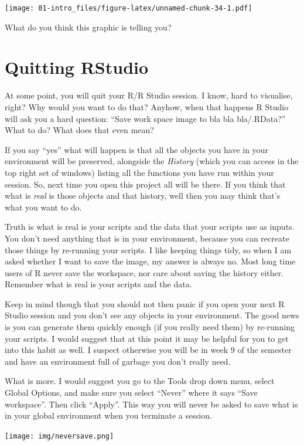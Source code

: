 \documentclass[]{book}
\begin{document}
\texttt{[image: 01-intro\_files/figure-latex/unnamed-chunk-34-1.pdf]}

What do you think this graphic is telling you?

\hypertarget{quitting-rstudio}{%
\section{Quitting RStudio}\label{quitting-rstudio}}

At some point, you will quit your R/R Studio session. I know, hard to visualise, right? Why would you want to do that? Anyhow, when that happens R Studio will ask you a hard question: ``Save work space image to bla bla bla/.RData?'' What to do? What does that even mean?

If you say ``yes'' what will happen is that all the objects you have in your environment will be preserved, alongside the \emph{History} (which you can access in the top right set of windows) listing all the functions you have run within your session. So, next time you open this project all will be there. If you think that what is \emph{real} is those objects and that history, well then you may think that's what you want to do.

Truth is what is real is your scripts and the data that your scripts use as inputs. You don't need anything that is in your environment, because you can recreate those things by re-running your scripts. I like keeping things tidy, so when I am asked whether I want to save the image, my answer is always no. Most long time users of R never save the workspace, nor care about saving the history either. Remember what is real is your scripts and the data.

Keep in mind though that you should not then panic if you open your next R Studio session and you don't see any objects in your environment. The good news is you can generate them quickly enough (if you really need them) by re-running your scripts. I would suggest that at this point it may be helpful for you to get into this habit as well. I suspect otherwise you will be in week 9 of the semester and have an environment full of garbage you don't really need.

What is more. I would suggest you go to the Tools drop down menu, select Global Options, and make sure you select ``Never'' where it says ``Save workspace''. Then click ``Apply''. This way you will never be asked to save what is in your global environment when you terminate a session.

\texttt{[image: img/neversave.png]}
\end{document}

